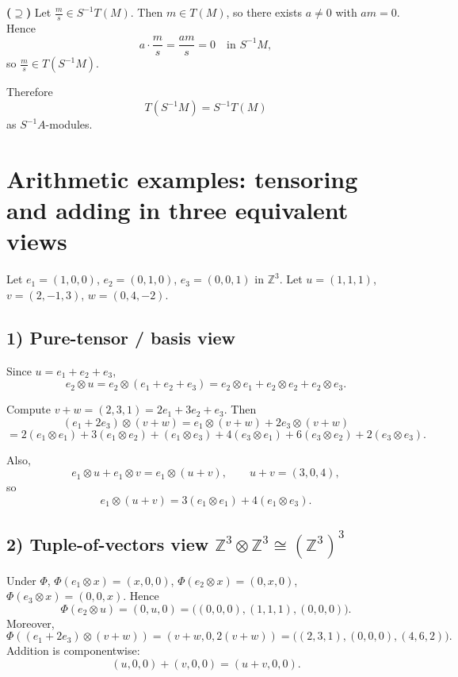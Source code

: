 \documentclass[12pt,a4paper]{article}
\theoremstyle{plain}
\theoremstyle{definition}      %
\begin{document}
\medskip
\textbf{(\(\supseteq\))} Let \(\frac{m}{s}\in S^{-1}T(M)\).
Then \(m\in T(M)\), so there exists \(a\neq 0\) with \(am=0\). Hence
\[
a\cdot \frac{m}{s}=\frac{am}{s}=0\quad\text{in }S^{-1}M,
\]
so \(\frac{m}{s}\in T(S^{-1}M)\).

\medskip
Therefore
\[
T(S^{-1}M)=S^{-1}T(M)
\]
as \(S^{-1}A\)-modules.

\section*{Arithmetic examples: tensoring and adding in three equivalent views}

Let \(e_1=(1,0,0)\), \(e_2=(0,1,0)\), \(e_3=(0,0,1)\) in \(\mathbb Z^3\).
Let \(u=(1,1,1)\), \(v=(2,-1,3)\), \(w=(0,4,-2)\).

\subsection*{1) Pure-tensor / basis view}
Since \(u=e_1+e_2+e_3\),
\[
e_2\otimes u
= e_2\otimes(e_1+e_2+e_3)
= e_2\otimes e_1 + e_2\otimes e_2 + e_2\otimes e_3.
\]

Compute \(v+w=(2,3,1)=2e_1+3e_2+e_3\). Then
\[
(e_1+2e_3)\otimes(v+w)
= e_1\otimes(v+w)+2e_3\otimes(v+w)
\]
\[
= 2(e_1\otimes e_1)+3(e_1\otimes e_2)+(e_1\otimes e_3)
+4(e_3\otimes e_1)+6(e_3\otimes e_2)+2(e_3\otimes e_3).
\]

Also,
\[
e_1\otimes u + e_1\otimes v = e_1\otimes(u+v),
\qquad
u+v=(3,0,4),
\]
so
\[
e_1\otimes(u+v)=3(e_1\otimes e_1)+4(e_1\otimes e_3).
\]

\subsection*{2) Tuple-of-vectors view \(\mathbb Z^3\otimes \mathbb Z^3 \cong (\mathbb Z^3)^3\)}
Under \(\Phi\), \(\Phi(e_1\otimes x)=(x,0,0)\), \(\Phi(e_2\otimes x)=(0,x,0)\), \(\Phi(e_3\otimes x)=(0,0,x)\).
Hence
\[
\Phi(e_2\otimes u)=(0,u,0)=\big((0,0,0),(1,1,1),(0,0,0)\big).
\]
Moreover,
\[
\Phi((e_1+2e_3)\otimes(v+w))
=(v+w,0,2(v+w))
=\big((2,3,1),(0,0,0),(4,6,2)\big).
\]
Addition is componentwise:
\[
(u,0,0)+(v,0,0)=(u+v,0,0).
\]
\end{document}
